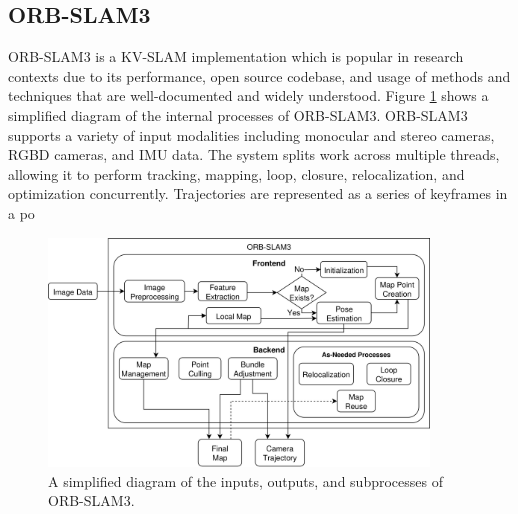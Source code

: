 \subsection{ORB-SLAM3}

ORB-SLAM3 is a KV-SLAM implementation which is popular in research contexts due to its performance, open source codebase, and usage of methods and techniques that are well-documented and widely understood. Figure \ref{fig:orb-slam3} shows a simplified diagram of the internal processes of ORB-SLAM3. ORB-SLAM3 supports a variety of input modalities including monocular and stereo cameras, RGBD cameras, and IMU data. The system splits work across multiple threads, allowing it to perform tracking, mapping, loop, closure, relocalization, and optimization concurrently. Trajectories are represented as a series of keyframes in a po

\begin{figure}[!ht]
    \centering
    \includegraphics[width=0.9\textwidth]{resources/orb-slam3.png}
    \caption[Simplified ORB-SLAM3 Operational Diagram]{A simplified diagram of the inputs, outputs, and subprocesses of ORB-SLAM3.}
    \label{fig:orb-slam3}
\end{figure}